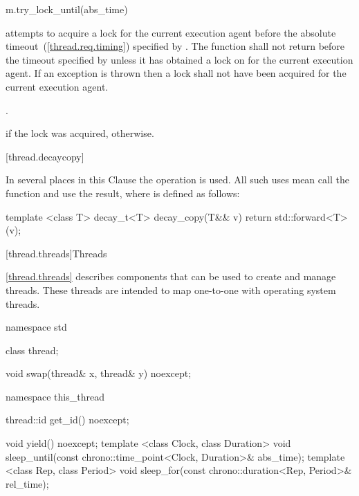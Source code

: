 \begin{itemdecl}
m.try_lock_until(abs_time)
\end{itemdecl}

\begin{itemdescr}
\pnum
\effects attempts to acquire a lock for the current execution agent before the absolute
timeout~(\ref{thread.req.timing}) specified by . The function shall not return
before the timeout specified by  unless it has obtained a lock on  for
the current execution agent. If an exception is thrown then a lock shall not have been acquired
for the current execution agent.

\pnum
\returntype {}.

\pnum
\returns {} if the lock was acquired,  otherwise.
\end{itemdescr}

[thread.decaycopy]{}

\pnum
In several places in this Clause the operation
 is used. All
such uses mean call the function  and use the
result, where  is defined as follows:

\begin{codeblock}
template <class T> decay_t<T> decay_copy(T&& v)
  { return std::forward<T>(v); }
\end{codeblock}

[thread.threads]{Threads}

\pnum
\ref{thread.threads} describes components that can be used to create and manage threads.
\enternote These threads are intended to map one-to-one with operating system threads.
\exitnote

%

\begin{codeblock}
namespace std {
  class thread;

  void swap(thread& x, thread& y) noexcept;

  namespace this_thread {
    thread::id get_id() noexcept;

    void yield() noexcept;
    template <class Clock, class Duration>
      void sleep_until(const chrono::time_point<Clock, Duration>& abs_time);
    template <class Rep, class Period>
      void sleep_for(const chrono::duration<Rep, Period>& rel_time);
  }
}
\end{codeblock}

